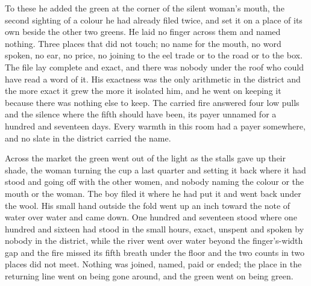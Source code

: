 To these he added the green at the corner of the silent woman's mouth, the second sighting of a colour he had already filed twice, and set it on a place of its own beside the other two greens. He laid no finger across them and named nothing. Three places that did not touch; no name for the mouth, no word spoken, no ear, no price, no joining to the eel trade or to the road or to the box. The file lay complete and exact, and there was nobody under the roof who could have read a word of it. His exactness was the only arithmetic in the district and the more exact it grew the more it isolated him, and he went on keeping it because there was nothing else to keep. The carried fire answered four low pulls and the silence where the fifth should have been, its payer unnamed for a hundred and seventeen days. Every warmth in this room had a payer somewhere, and no slate in the district carried the name.

Across the market the green went out of the light as the stalls gave up their shade, the woman turning the cup a last quarter and setting it back where it had stood and going off with the other women, and nobody naming the colour or the mouth or the woman. The boy filed it where he had put it and went back under the wool. His small hand outside the fold went up an inch toward the note of water over water and came down. One hundred and seventeen stood where one hundred and sixteen had stood in the small hours, exact, unspent and spoken by nobody in the district, while the river went over water beyond the finger's-width gap and the fire missed its fifth breath under the floor and the two counts in two places did not meet. Nothing was joined, named, paid or ended; the place in the returning line went on being gone around, and the green went on being green.
